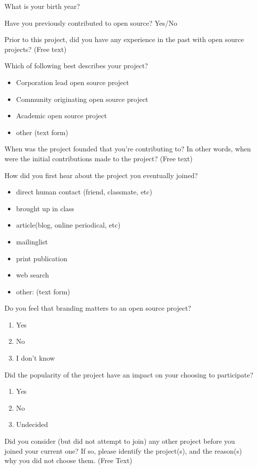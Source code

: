 \begin{table}
What is your birth year?

Have you previously contributed to open source? Yes/No

Prior to this project, did you have any experience in the past with open source projects? (Free text)

Which of following best describes your project?
\begin{itemize}
\item Corporation lead open source project
\item Community originating open source project
\item Academic open source project
\item other (text form)
\end{itemize}
  
  
When was the project founded that you're contributing to? In other words, when were the initial contributions made to the project? (Free text)

How did you first hear about the project you eventually joined?
\begin{itemize}
\item direct human contact (friend, classmate, etc)
\item  brought up in class
\item article(blog, online periodical, etc)
\item mailinglist
\item print publication
\item web search
\item other: (text form)
\end{itemize}

Do you feel that branding matters to an open source project?
\begin{enumerate}
\item Yes
\item No
\item I don't know
\end{enumerate}

 Did the popularity of the project have an impact on your choosing to participate?
\begin{enumerate}
\item Yes
\item No
\item Undecided
\end{enumerate}

 Did you consider (but did not attempt to join) any other project before you joined your current one? If so, please identify the project(s), and the reason(s) why you did not choose them. (Free Text)


\end{table}
